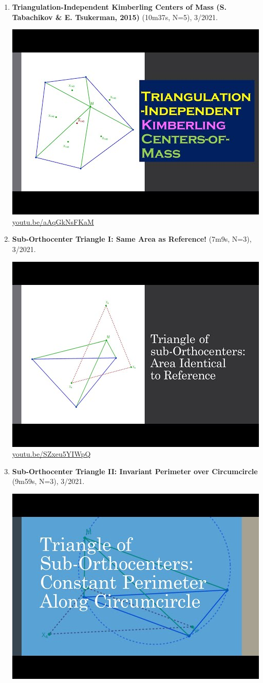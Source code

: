 \documentclass[12pt]{amsart}
\begin{document}
\begin{enumerate}[resume]
\item \textbf{Triangulation-Independent Kimberling Centers of Mass (S. Tabachikov \& E. Tsukerman, 2015)} (10m37s, N=5), 3/2021. 
\begin{center}\includegraphics[width=.5\textwidth]{pics/aAqGkNsFKaM.jpg} \\ 
\href{https://youtu.be/aAqGkNsFKaM}{\url{youtu.be/aAqGkNsFKaM}}\end{center}
% 
\item \textbf{Sub-Orthocenter Triangle I: Same Area as Reference!} (7m9s, N=3), 3/2021. 
\begin{center}\includegraphics[width=.5\textwidth]{pics/SZxeu5YIWpQ.jpg} \\ 
\href{https://youtu.be/SZxeu5YIWpQ}{\url{youtu.be/SZxeu5YIWpQ}}\end{center}
% 
\item \textbf{Sub-Orthocenter Triangle II: Invariant Perimeter over Circumcircle} (9m59s, N=3), 3/2021. 
\begin{center}\includegraphics[width=.5\textwidth]{pics/GXwuDV0fdoU.jpg} \\ 

\end{center}
\end{enumerate}
\end{document}
